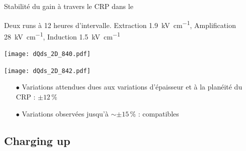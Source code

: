     \begin{frame}{Stabilité du gain à travers le CRP dans le \TOO{}}
        \begin{scriptsize}
            \centering Deux runs à 12 heures d'intervalle. Extraction \SI{1.9}{\kilo\volt\per\centi\meter}, Amplification \SI{28}{\kilo\volt\per\centi\meter}, Induction \SI{1.5}{\kilo\volt\per\centi\meter}\\\vspace{0.2cm}
            \begin{center} \vspace{-0.5cm}\texttt{[image: dQds\_2D\_840.pdf]} \end{center}
            \begin{center} \vspace{-0.5cm}\texttt{[image: dQds\_2D\_842.pdf]} \end{center}
            \vspace{-0.5cm}
            \begin{itemize}
    			\item[$\bullet$] Variations attendues dues aux variations d'épaisseur et à la planéité du CRP : $\pm 12 \,\%$
    			\item[$\bullet$] Variations observées jusqu'à $\sim \pm15\,\%$ : compatibles
			\end{itemize}
        \end{scriptsize}
    \end{frame}

  \subsection{Charging up}

